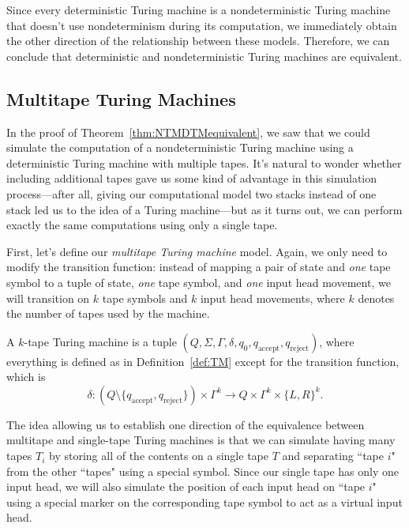 Since every deterministic Turing machine is a nondeterministic Turing machine that doesn't use nondeterminism during its computation, we immediately obtain the other direction of the relationship between these models. Therefore, we can conclude that deterministic and nondeterministic Turing machines are equivalent.

\subsection{Multitape Turing Machines}

In the proof of Theorem~\ref{thm:NTMDTMequivalent}, we saw that we could simulate the computation of a nondeterministic Turing machine using a deterministic Turing machine with multiple tapes. It's natural to wonder whether including additional tapes gave us some kind of advantage in this simulation process---after all, giving our computational model two stacks instead of one stack led us to the idea of a Turing machine---but as it turns out, we can perform exactly the same computations using only a single tape.

First, let's define our \emph{multitape Turing machine} model. Again, we only need to modify the transition function: instead of mapping a pair of state and \emph{one} tape symbol to a tuple of state, \emph{one} tape symbol, and \emph{one} input head movement, we will transition on $k$ tape symbols and $k$ input head movements, where $k$ denotes the number of tapes used by the machine.

\begin{definition}\label{def:multitapeTM}
A $k$-tape Turing machine is a tuple $(Q, \Sigma, \Gamma, \delta, q_{0}, q_{\text{accept}}, q_{\text{reject}})$, where everything is defined as in Definition~\ref{def:TM} except for the transition function, which is
\begin{equation*}
\delta: \left( Q \setminus \{q_{\text{accept}}, q_{\text{reject}}\} \right) \times \Gamma^{k} \to Q \times \Gamma^{k} \times \{L, R\}^{k}.
\end{equation*}
\end{definition}

The idea allowing us to establish one direction of the equivalence between multitape and single-tape Turing machines is that we can simulate having many tapes $T_{i}$ by storing all of the contents on a single tape $T$ and separating ``tape $i$" from the other ``tapes" using a special symbol. Since our single tape has only one input head, we will also simulate the position of each input head on ``tape $i$" using a special marker on the corresponding tape symbol to act as a virtual input head.

